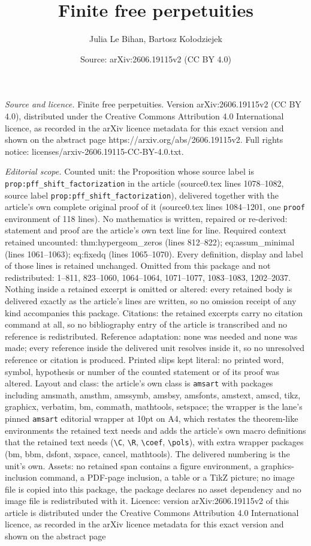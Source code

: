 \documentclass[10pt,a4paper]{amsart}
\title[Finite free perpetuities]{Finite free perpetuities}
\author{Julia Le Bihan, Bartosz Ko{\l}odziejek}
\date{Source: arXiv:2606.19115v2 (CC BY 4.0)}
\begin{document}
\maketitle

\noindent\emph{Source and licence.} Finite free perpetuities. Version arXiv:2606.19115v2 (CC BY 4.0), distributed under the Creative Commons Attribution 4.0 International licence, as recorded in the arXiv licence metadata for this exact version and shown on the abstract page https://arxiv.org/abs/2606.19115v2. Full rights notice: licenses/arxiv-2606.19115-CC-BY-4.0.txt.\par\smallskip

\noindent\textit{Editorial scope.} Counted unit: the Proposition whose source label is \texttt{prop:pff\_shift\_factorization} in the article (source0.tex lines 1078--1082, source label \texttt{prop:pff\_shift\_factorization}), delivered together with the article's own complete original proof of it (source0.tex lines 1084--1201, one \texttt{proof} environment of 118 lines). No mathematics is written, repaired or re-derived: statement and proof are the article's own text line for line. Required context retained uncounted: thm:hypergeom\_zeros (lines 812--822); eq:assum\_minimal (lines 1061--1063); eq:fixedq (lines 1065--1070). Every definition, display and label of those lines is retained unchanged. Omitted from this package and not redistributed: 1--811, 823--1060, 1064--1064, 1071--1077, 1083--1083, 1202--2037. Nothing inside a retained excerpt is omitted or altered: every retained body is delivered exactly as the article's lines are written, so no omission receipt of any kind accompanies this package. Citations: the retained excerpts carry no citation command at all, so no bibliography entry of the article is transcribed and no reference is redistributed. Reference adaptation: none was needed and none was made; every reference inside the delivered unit resolves inside it, so no unresolved reference or citation is produced. Printed slips kept literal: no printed word, symbol, hypothesis or number of the counted statement or of its proof was altered. Layout and class: the article's own class is \texttt{amsart} with packages including amsmath, amsthm, amssymb, amsbsy, amsfonts, amstext, amscd, tikz, graphicx, verbatim, bm, commath, mathtools, setspace; the wrapper is the lane's pinned \texttt{amsart} editorial wrapper at 10pt on A4, which restates the theorem-like environments the retained text needs and adds the article's own macro definitions that the retained text needs (\texttt{\textbackslash C}, \texttt{\textbackslash R}, \texttt{\textbackslash coef}, \texttt{\textbackslash pols}), with extra wrapper packages (bm, bbm, dsfont, xspace, cancel, mathtools). The delivered numbering is the unit's own. Assets: no retained span contains a figure environment, a graphics-inclusion command, a PDF-page inclusion, a table or a TikZ picture; no image file is copied into this package, the package declares no asset dependency and no image file is redistributed with it. Licence: version arXiv:2606.19115v2 of this article is distributed under the Creative Commons Attribution 4.0 International licence, as recorded in the arXiv licence metadata for this exact version and shown on the abstract page 
\end{document}

